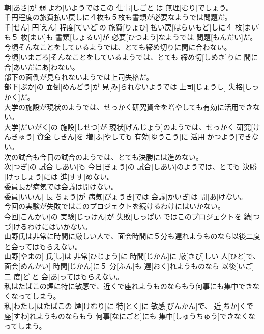 \documentclass[8pt]{extreport}
\begin{document}
\begin{CJK}{UTF8}{min}
\\	朝[あさ]が 弱[よわ]いようではこの 仕事[しごと]は 無理[むり]でしょう。
\\	千円程度の旅費払い戻しに４枚も５枚も書類が必要なようでは問題だ。	
\\	千[せん] 円[えん] 程度[ていど]の 旅費[りょひ] 払い戻[はらいもど]しに４ 枚[まい]も５ 枚[まい]も 書類[しょるい]が 必要[ひつよう]なようでは 問題[もんだい]だ。
\\	今頃そんなことをしているようでは、とても締め切りに間に合わない。	
\\	今頃[いまごろ]そんなことをしているようでは、とても 締め切[しめき]りに 間に合[あいだにあ]わない。
\\	部下の面倒が見られないようでは上司失格だ。	
\\	部下[ぶか]の 面倒[めんどう]が 見[み]られないようでは 上司[じょうし] 失格[しっかく]だ。
\\	大学の施設が現状のようでは、せっかく研究資金を増やしても有効に活用できない。	
\\	大学[だいがく]の 施設[しせつ]が 現状[げんじょう]のようでは、せっかく 研究[けんきゅう] 資金[しきん]を 増[ふ]やしても 有効[ゆうこう]に 活用[かつよう]できない。
\\	次の試合も今日の試合のようでは、とても決勝には進めない。	
\\	次[つぎ]の 試合[しあい]も 今日[きょう]の 試合[しあい]のようでは、とても 決勝[けっしょう]には 進[すす]めない。
\\	委員長が病気では会議は開けない。	
\\	委員[いいん] 長[ちょう]が 病気[びょうき]では 会議[かいぎ]は 開[あ]けない。
\\	今回の実験が失敗ではこのプロジェクトを続けるわけにはいかない。	
\\	今回[こんかい]の 実験[じっけん]が 失敗[しっぱい]ではこのプロジェクトを 続[つづ]けるわけにはいかない。
\\	山野氏は非常に時間に厳しい人で、面会時間に５分も遅れようものなら以後二度と会ってはもらえない。	
\\	山野[やまの] 氏[し]は 非常[ひじょう]に 時間[じかん]に 厳[きび]しい 人[ひと]で、 面会[めんかい] 時間[じかん]に５ 分[ふん]も 遅[おく]れようものなら 以後[いご]二 度[ど]と 会[あ]ってはもらえない。
\\	私はたばこの煙に特に敏感で、近くで座れようものならもう何事にも集中できなくなってしまう。	
\\	私[わたし]はたばこの 煙[けむり]に 特[とく]に 敏感[びんかん]で、 近[ちか]くで 座[すわ]れようものならもう 何事[なにごと]にも 集中[しゅうちゅう]できなくなってしまう。

\end{CJK}
\end{document}
